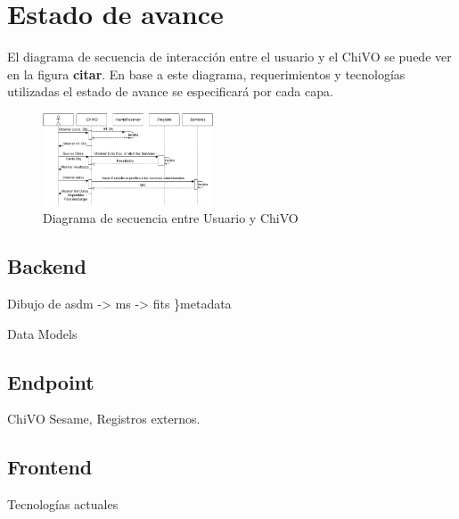 \section{Estado de avance}

El diagrama de secuencia de interacción entre el usuario y el ChiVO se puede
ver en la figura \textbf{citar}. En base a este diagrama, requerimientos y
tecnologías utilizadas el estado de avance se especificará por cada capa.

\begin{figure}[h]
    \centering
    \includegraphics[width=0.45\textwidth]{images/secuencia.png}
    \caption{Diagrama de secuencia entre Usuario y ChiVO}
    \label{fig:secuencia}
\end{figure}

\subsection{Backend}
Dibujo de asdm -> ms -> fits \}metadata

Data Models

\subsection{Endpoint}
ChiVO Sesame, Registros externos.

\subsection{Frontend}
Tecnologías actuales

